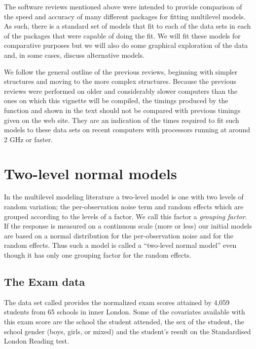 \documentclass[12pt]{article}
\begin{document}
The software reviews mentioned above were intended to provide
comparison of the speed and accuracy of many different packages for
fitting multilevel models.  As such, there is a standard set of
models that fit to each of the data sets in each of the packages that
were capable of doing the fit.  We will fit these models for
comparative purposes but we will also do some graphical exploration of
the data and, in some cases, discuss alternative models.

We follow the general outline of the previous reviews, beginning with
simpler structures and moving to the more complex structures.  Because
the previous reviews were performed on older and considerably slower
computers than the ones on which this vignette will be compiled, the
timings produced by the  function and shown in the
text should not be compared with previous timings given on the web
site.  They are an indication of the times required to fit such models
to these data sets on recent computers with processors running at
around 2 GHz or faster.

\section{Two-level normal models}
\label{sec:TwoLevelNormal}

In the multilevel modeling literature a two-level model is one with
two levels of random variation; the per-observation noise term and
random effects which are grouped according to the levels of a factor.
We call this factor a \textit{grouping factor}. If the response is
measured on a continuous scale (more or less) our initial models are
based on a normal distribution for the per-observation noise and for
the random effects.  Thus such a model is called a ``two-level normal
model'' even though it has only one grouping factor for the random effects.


\subsection{The Exam data}
\label{sec:Examdata}

The data set called  provides the normalized exam scores
attained by 4,059 students from 65 schools in inner London.  Some of
the covariates available with this exam score are the school the
student attended, the sex of the student, the school gender (boys,
girls, or mixed) and the student's result on the Standardised London
Reading test.
\end{document}
